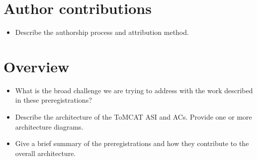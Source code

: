 \documentclass[oneside,9pt]{memoir}
\begin{document}
\section{Author contributions}
\begin{itemize}
    \item Describe the authorship process and attribution method.
\end{itemize}

\section{Overview}
\begin{itemize}
    \item What is the broad challenge we are trying to address with the work
        described in these preregistrations?
    \item Describe the architecture of the ToMCAT ASI and ACs. Provide one or
        more architecture diagrams.
    \item Give a brief summary of the preregistrations and how they contribute
        to the overall architecture.
\end{itemize}








\printbibliography
\end{document}
